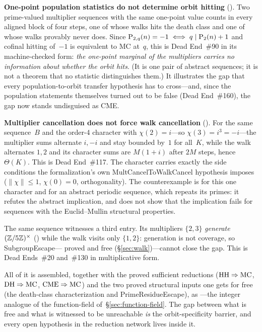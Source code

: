 \begin{keyresult}
\textbf{One-point population statistics do not determine orbit hitting}
().
Two prime-valued multiplier sequences with the same one-point value
counts in every aligned block of four steps, one of whose walks hits the
death class and one of whose walks provably never does.  Since
$\mathrm{P}_{2,q}(n) = -1 \iff q \mid \mathrm{P}_{2}(n)+1$ and cofinal hitting
of~$-1$ is equivalent to MC at~$q$, this is Dead End~\#90 in its
machine-checked form: \emph{the one-point marginal of the multipliers
carries no information about whether the orbit hits}.  (It is one pair
of abstract sequences; it is not a theorem that no statistic
distinguishes them.)  It illustrates the gap that every
population-to-orbit transfer hypothesis has to cross---and, since
the population statements themselves turned out to be false (Dead
End~\#160), the gap now stands undisguised as CME\@.

\smallskip
\textbf{Multiplier cancellation does not force walk cancellation}
().
For the same sequence~$B$ and the order-4 character with
$\chi(2) = i$---so $\chi(3) = i^3 = -i$---the multiplier sums alternate
$i, -i$ and stay bounded by~$1$ for all~$K$, while the walk alternates
$1,2$ and its character sums are $M(1+i)$ after $2M$ steps, hence
$\Theta(K)$.  This is Dead End~\#117.  The character carries exactly the
side conditions the formalization's own MultCancelToWalkCancel
hypothesis imposes ($\|\chi\| \leq 1$, $\chi(0) = 0$, orthogonality).
The counterexample is for this one character and for an abstract
periodic sequence, which repeats its primes: it refutes the abstract
implication, and does not show that the implication fails for sequences
with the Euclid--Mullin structural properties.
\end{keyresult}

\noindent
The same sequence witnesses a third entry.  Its multipliers $\{2,3\}$
\emph{generate} $(\mathbb{Z}/5\mathbb{Z})^\times$
() while the walk
visits only $\{1,2\}$: generation is not coverage, so SubgroupEscape---
proved and free (\S\ref{sec:walk})---cannot close the gap.  This is
Dead Ends~\#20 and~\#130 in multiplicative form.

All of it is assembled, together with the proved sufficient reductions
($\mathrm{HH} \Rightarrow \mathrm{MC}$, $\mathrm{DH} \Rightarrow \mathrm{MC}$,
$\mathrm{CME} \Rightarrow \mathrm{MC}$) and the two proved structural inputs one
gets for free (the death-class characterization and PrimeResidueEscape),
as ---the
integer analogue of the function-field
of~\S\ref{sec:function-field}.  The gap between what is free and what is
witnessed to be unreachable \emph{is} the orbit-specificity barrier, and
every open hypothesis in the reduction network lives inside it.



